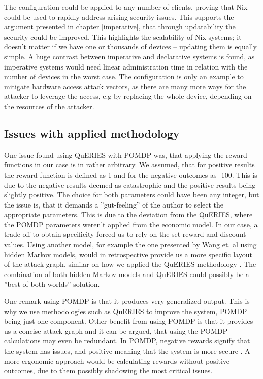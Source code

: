 The configuration could be applied to any number of clients, proving
that Nix could be used to rapidly address arising security
issues. This supports the argument presented in chapter
\ref{imperative}, that through updatability the security could be
improved. This highlights the scalability of Nix systems; it doesn't
matter if we have one or thousands of devices – updating them is
equally simple. A huge contrast between imperative and declarative
systems is found, as imperative systems would need linear
administration time in relation with the number of devices in the worst case. The
configuration is only an example to mitigate hardware access attack
vectors, as there are many more ways for the attacker to leverage the
access, e.g by replacing the whole device, depending on the resources
of the attacker.

\subsection{Issues with applied methodology} \label{issues}

One issue found using QuERIES with POMDP was, that applying the reward
functions in our case is in rather arbitrary. We assumed, that for
positive results the reward function is defined as 1 and for the
negative outcomes as -100. This is due to the negative results deemed
as catastrophic and the positive results being slightly positive. The
choice for both parameters could have been any integer, but the issue
is, that it demands a ''gut-feeling'' of the author to select the
appropriate parameters. This is due to the deviation from the QuERIES,
where the POMDP parameters weren't applied from the economic model. In our case, a trade-off to obtain
specificity forced us to rely on the set reward and discount
values. Using another model, for example the one presented by Wang
et. al using hidden Markov models, would in retrospective provide us a
more specific layout of the attack graph, similar on how we applied
the QuERIES methodology \cite{wang2010framework}. The
combination of both hidden Markov models and QuERIES could possibly be a ''best
of both worlds'' solution.

One remark using POMDP is that it produces very generalized
output. This is why we use methodologies such as QuERIES to improve
the system, POMDP being just one component. Other benefit from using
POMDP is that it provides us a concise attack graph and it can be argued, that
using the POMDP calculations may even be redundant. In POMDP, negative
rewards signify that the system has issues, and positive meaning that
the system is more secure \cite{mcabeeMarkov}. A more ergonomic approach
would be calculating rewards without positive outcomes, due to them
possibly shadowing the most critical issues.

